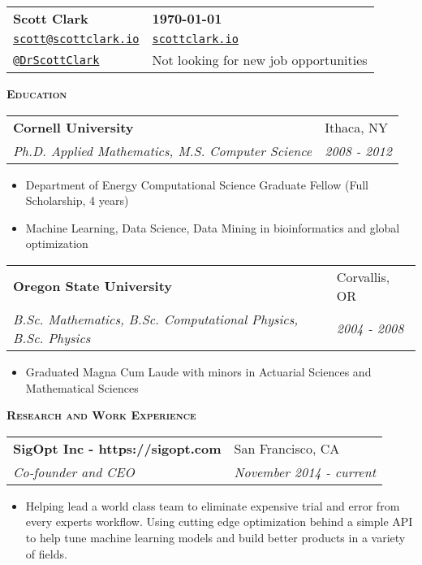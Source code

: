 \documentclass[letterpaper, 11pt]{article}
\makeatletter
\renewcommand{\section}[1]{%
  \begin{tcolorbox}
    \textsc{\textbf{\large{#1}}}
  \end{tcolorbox}
}
\newcommand{\entry}[4]{%
  \begin{tabularx}{\linewidth}{@{}Xl@{}}
    \textbf{#1} & #2          \\
    \textit{#3} & \textit{#4} \\
  \end{tabularx}
}
\newcommand{\email}[1]{%
  \href{mailto:#1}{\texttt{#1}}
}
\newcommand{\website}[1]{%
  \href{http://#1}{\texttt{#1}}
}
\newcommand{\twitter}[1]{%
  \href{https://twitter.com/#1}{\texttt{@#1}}
}
\makeatother
\begin{document}
  \begin{tabularx}{\linewidth}{@{}Xl@{}}
    \textbf{\Large{Scott Clark}} & \textbf{\today}                       \\
    \email{scott@scottclark.io}  & \website{scottclark.io}               \\
    \twitter{DrScottClark}       & Not looking for new job opportunities \\
  \end{tabularx}

  \section{Education}

  \entry{Cornell University}{Ithaca, NY}{Ph.D. Applied Mathematics, M.S. Computer Science}{2008 - 2012}
  \begin{itemize}
    \item{Department of Energy Computational Science Graduate Fellow (Full Scholarship, 4 years)}
    \item{Machine Learning, Data Science, Data Mining in bioinformatics and global optimization}
  \end{itemize}

  \entry{Oregon State University}{Corvallis, OR}{B.Sc. Mathematics, B.Sc. Computational Physics, B.Sc. Physics}{2004 - 2008}
  \begin{itemize}
    \item{Graduated Magna Cum Laude with minors in Actuarial Sciences and Mathematical Sciences}
  \end{itemize}

  \section{Research and Work Experience}

  \entry{SigOpt Inc - https://sigopt.com}{San Francisco, CA}{Co-founder and CEO}{November 2014 - current}
  \begin{itemize}
    \item{Helping lead a world class team to eliminate expensive trial and error from every experts workflow. Using cutting edge optimization behind a simple API to help tune machine learning models and build better products in a variety of fields.}
  \end{itemize}
\end{document}

